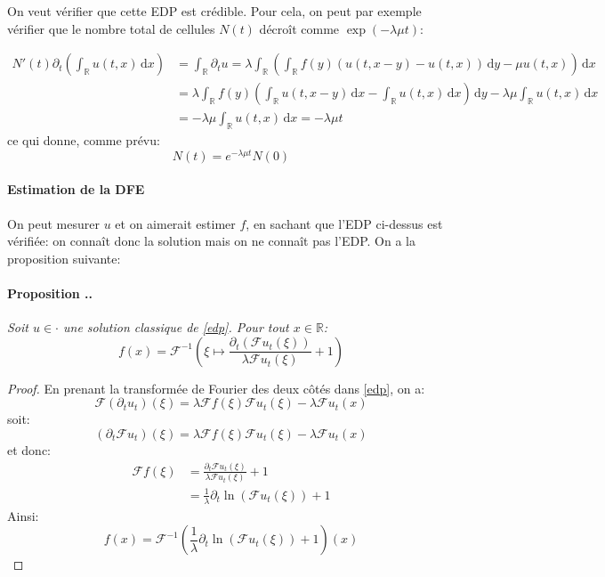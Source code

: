 \documentclass[12pt]{article}
\newcounter{prop}[section]
\newcommand{\prop}[1]{\stepcounter{prop}\paragraph{Proposition \arabic{section}.\arabic{prop}.}\textit{\newline #1}\vspace{0.1cm}}
\newcommand{\pth}[1]{\left(#1\right)}
\newcommand{\cro}[1]{\left[#1\right]}
\newcommand{\ou}{\hspace{1cm}\text{ou}\hspace{1cm}}
\newcommand{\de}{\,\mathrm{d}}
\newcommand{\Er}{\mathbb{R}}
\newcommand{\Esp}[1]{\mathbb{E}\cro{#1}}
\newcommand{\dr}{\partial}
\newcommand{\fr}{\mathcal{F}}
\begin{document}
On veut vérifier que cette EDP est crédible. Pour cela, on peut par exemple vérifier que le nombre total de cellules $N(t)$ décroît comme $\exp(-\lambda\mu t)$:

\begin{align*}
    N'(t)\dr_t\pth{\int_{\Er}u(t,x)\de x}&=\int_{\Er}\dr_tu=\lambda \int_{\Er}\pth{\int_{\Er}f(y)(u(t,x-y)-u(t,x))\de y-\mu u(t,x)}\de x\\
    &=\lambda\int_{\Er}f(y)\pth{\int_{\Er}u(t,x-y)\de x-\int_{\Er}u(t,x)\de x}\de y-\lambda\mu\int_{\Er}u(t,x)\de x\\
    &=-\lambda\mu\int_{\Er}u(t,x)\de x=-\lambda\mu t
\end{align*}
ce qui donne, comme prévu:
\[N(t)=e^{-\lambda\mu t}N(0)\]

\paragraph{Estimation de la DFE}

On peut mesurer $u$ et on aimerait estimer $f$, en sachant que l'EDP ci-dessus est vérifiée:  on connaît donc la solution mais on ne connaît pas l'EDP. On a la proposition suivante:
\prop{Soit $u\in\cdot$ une solution classique de \eqref{edp}. Pour tout $x\in\mathbb{R}$:
  \begin{equation}\label{edp_sol}
    f(x)=\fr^{-1}\pth{\xi\mapsto\frac{\dr_t\pth{\fr u_t(\xi)}}{\lambda\fr u_t(\xi)}+1}    
  \end{equation}
}

\begin{proof}
  En prenant la transformée de Fourier des deux côtés dans \eqref{edp}, on a:
\[\mathcal{F}\pth{\dr_tu_t}(\xi)=\lambda \mathcal{F}f(\xi)\mathcal{F}{u_t}(\xi)-\lambda\mathcal{F}u_t(x)\]
soit:
\[\pth{\dr_t\mathcal{F}u_t}(\xi)=\lambda \mathcal{F}f(\xi)\mathcal{F}{u_t}(\xi)-\lambda\mathcal{F}u_t(x)\]
et donc:
\begin{align*}
\mathcal{F}f(\xi)&=\frac{\dr_t\mathcal{F}u_t(\xi)}{\lambda \mathcal{F}u_t(\xi)}+1\\
&=\frac{1}{\lambda}\dr_t\ln\pth{\mathcal{F}u_t(\xi)}+1
\end{align*}
Ainsi:
\[f(x)=\mathcal{F}^{-1}\pth{\frac{1}{\lambda}\dr_t\ln\pth{\mathcal{F}u_t(\xi)}+1}(x)\]

\end{proof}


%
%
%
\end{document}
